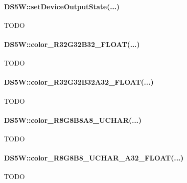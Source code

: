 \paragraph{DS5W::setDeviceOutputState(...)}
TODO

\paragraph{DS5W::color\_R32G32B32\_FLOAT(...)}
TODO

\paragraph{DS5W::color\_R32G32B32A32\_FLOAT(...)}
TODO

\paragraph{DS5W::color\_R8G8B8A8\_UCHAR(...)}
TODO

\paragraph{DS5W::color\_R8G8B8\_UCHAR\_A32\_FLOAT(...)}
TODO

\newpage